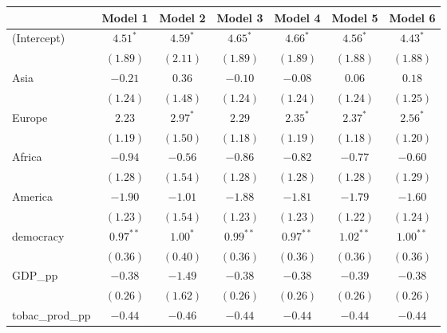 
\begin{table}[!h]
\begin{center}
\begin{tabular}{l c c c c c c }
\toprule
 & Model 1 & Model 2 & Model 3 & Model 4 & Model 5 & Model 6 \\
\midrule
(Intercept)             & $4.51^{*}$   & $4.59^{*}$   & $4.65^{*}$   & $4.66^{*}$   & $4.56^{*}$   & $4.43^{*}$   \\
                        & $(1.89)$     & $(2.11)$     & $(1.89)$     & $(1.89)$     & $(1.88)$     & $(1.88)$     \\
Asia                    & $-0.21$      & $0.36$       & $-0.10$      & $-0.08$      & $0.06$       & $0.18$       \\
                        & $(1.24)$     & $(1.48)$     & $(1.24)$     & $(1.24)$     & $(1.24)$     & $(1.25)$     \\
Europe                  & $2.23$       & $2.97^{*}$   & $2.29$       & $2.35^{*}$   & $2.37^{*}$   & $2.56^{*}$   \\
                        & $(1.19)$     & $(1.50)$     & $(1.18)$     & $(1.19)$     & $(1.18)$     & $(1.20)$     \\
Africa                  & $-0.94$      & $-0.56$      & $-0.86$      & $-0.82$      & $-0.77$      & $-0.60$      \\
                        & $(1.28)$     & $(1.54)$     & $(1.28)$     & $(1.28)$     & $(1.28)$     & $(1.29)$     \\
America                 & $-1.90$      & $-1.01$      & $-1.88$      & $-1.81$      & $-1.79$      & $-1.60$      \\
                        & $(1.23)$     & $(1.54)$     & $(1.23)$     & $(1.23)$     & $(1.22)$     & $(1.24)$     \\
democracy               & $0.97^{**}$  & $1.00^{*}$   & $0.99^{**}$  & $0.97^{**}$  & $1.02^{**}$  & $1.00^{**}$  \\
                        & $(0.36)$     & $(0.40)$     & $(0.36)$     & $(0.36)$     & $(0.36)$     & $(0.36)$     \\
GDP\_pp                 & $-0.38$      & $-1.49$      & $-0.38$      & $-0.38$      & $-0.39$      & $-0.38$      \\
                        & $(0.26)$     & $(1.62)$     & $(0.26)$     & $(0.26)$     & $(0.26)$     & $(0.26)$     \\
tobac\_prod\_pp         & $-0.44$      & $-0.46$      & $-0.44$      & $-0.44$      & $-0.44$      & $-0.44$      \\

\end{tabular}
\end{center}
\end{table}
